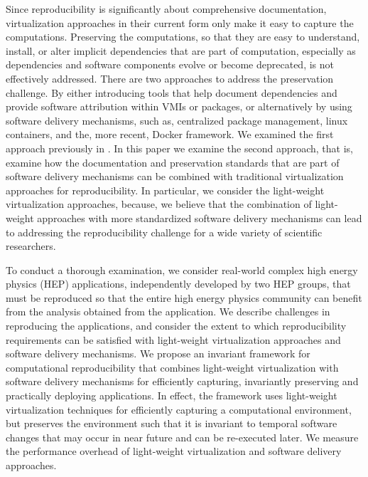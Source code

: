 Since reproducibility is significantly about comprehensive documentation, virtualization approaches in their current form only make it easy to capture the computations. Preserving the computations, so that they are easy to understand, install, or alter implicit dependencies that are part of computation, especially as dependencies and software components evolve or become deprecated, is not effectively addressed. There are two approaches to address the preservation challenge. By either introducing tools that help document dependencies and provide software attribution within VMIs or packages, or alternatively by using software delivery mechanisms, such as, centralized package management, linux containers, and the, more recent, Docker framework. We examined the first approach previously in \cite{SoftProv}. In this paper we examine the second approach, that is, examine how the documentation and preservation standards that are part of software delivery mechanisms can be combined with traditional virtualization approaches for reproducibility. In particular, we consider the light-weight virtualization approaches, because, we believe that the combination of light-weight approaches with more standardized software delivery mechanisms can lead to addressing the reproducibility challenge for a wide variety of scientific researchers. 

To conduct a thorough examination, we consider real-world complex high energy physics (HEP) applications, independently developed by two HEP groups, that must be reproduced so that the entire high energy physics community can benefit from the analysis obtained from the application. We describe challenges in reproducing the applications, and consider the extent to which reproducibility requirements can be satisfied with light-weight virtualization approaches and software delivery mechanisms. We propose an invariant framework for computational reproducibility that combines light-weight virtualization with software delivery mechanisms for efficiently capturing, invariantly preserving and practically deploying applications. In effect, the framework uses light-weight virtualization techniques for efficiently capturing a computational environment, but preserves the environment such that it is invariant to temporal software changes that may occur in near future and can be re-executed later. We measure the performance overhead of  light-weight virtualization and software delivery approaches. 

